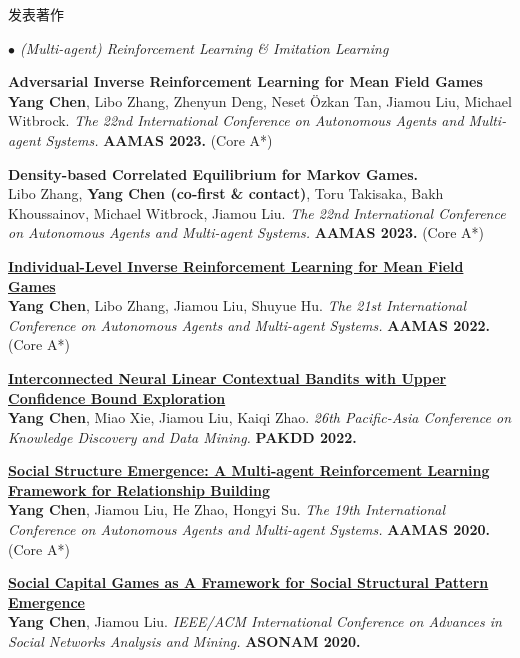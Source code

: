 \documentclass{resume} %
\begin{document}
\begin{rSection}{发表著作}
\begin{rSubsection}{\large\em $\bullet$ (Multi-agent) Reinforcement Learning \& Imitation Learning}{}{}{}
	\item {\bf Adversarial Inverse Reinforcement Learning for Mean Field Games}\\
		\textbf{Yang Chen}, Libo Zhang, Zhenyun Deng, Neset \"{O}zkan Tan, Jiamou Liu, Michael Witbrock. {\em The 22nd International Conference on Autonomous Agents and Multi-agent Systems.} \textbf{AAMAS 2023.} (Core A*)\\
	\item {\bf Density-based Correlated Equilibrium for Markov Games.}\\
		Libo Zhang, \textbf{Yang Chen (co-first \& contact)}, Toru Takisaka, Bakh Khoussainov, Michael Witbrock, Jiamou Liu. {\em The 22nd International Conference on Autonomous Agents and Multi-agent Systems.} \textbf{AAMAS 2023.} (Core A*)\\
	\item {\href{https://ifaamas.org/Proceedings/aamas2022/pdfs/p253.pdf}{\bf Individual-Level Inverse Reinforcement Learning for Mean Field Games}}\\
		\textbf{Yang Chen}, Libo Zhang, Jiamou Liu, Shuyue Hu. {\em The 21st International Conference on Autonomous Agents and Multi-agent Systems.} \textbf{AAMAS 2022.} (Core A*)\\
	\item {\href{}{\bf  Interconnected Neural Linear Contextual Bandits with Upper Confidence Bound Exploration}}\\
		\textbf{Yang Chen}, Miao Xie, Jiamou Liu, Kaiqi Zhao. {\em 26th Pacific-Asia Conference on Knowledge Discovery and Data Mining.} \textbf{PAKDD 2022.} \\
	\item {\href{http://www.ifaamas.org/Proceedings/aamas2020/pdfs/p1807.pdf}{\bf Social Structure Emergence: A Multi-agent Reinforcement Learning Framework for Relationship Building}}\\ 
		\textbf{Yang Chen}, Jiamou Liu, He Zhao, Hongyi Su. {\em The 19th International Conference on Autonomous Agents and Multi-agent Systems.} \textbf{AAMAS 2020.} (Core A*)\\
	\item {\href{}{\bf Social Capital Games as A Framework for Social Structural Pattern Emergence}}\\ 
		\textbf{Yang Chen}, Jiamou Liu. {\em IEEE/ACM International Conference on Advances in Social Networks Analysis and Mining.} \textbf{ASONAM 2020.}\\
\end{rSubsection}


\end{rSection}
\end{document}
